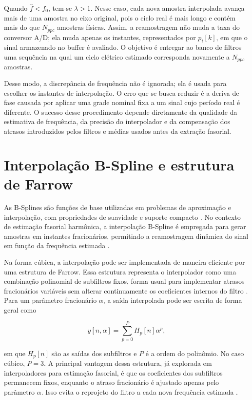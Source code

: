 Quando $\hat{f}<f_0$, tem-se $\lambda>1$. Nesse caso, cada nova amostra interpolada avança mais de uma amostra no eixo original, pois o ciclo real é mais longo e contém mais do que $N_{ppc}$ amostras físicas. Assim, a reamostragem não muda a taxa do conversor A/D; ela muda apenas os instantes, representados por $p_i[k]$, em que o sinal armazenado no buffer é avaliado. O objetivo é entregar ao banco de filtros uma sequência na qual um ciclo elétrico estimado corresponda novamente a $N_{ppc}$ amostras.

Desse modo, a discrepância de frequência não é ignorada; ela é usada para escolher os instantes de interpolação. O erro que se busca reduzir é a deriva de fase causada por aplicar uma grade nominal fixa a um sinal cujo período real é diferente. O sucesso desse procedimento depende diretamente da qualidade da estimativa de frequência, da precisão do interpolador e da compensação dos atrasos introduzidos pelos filtros e médias usados antes da extração fasorial.

\section{Interpolação B-Spline e estrutura de Farrow}

As B-Splines são funções de base utilizadas em problemas de aproximação e interpolação, com propriedades de suavidade e suporte compacto \cite{uns99}. No contexto de estimação fasorial harmônica, a interpolação B-Spline é empregada para gerar amostras em instantes fracionários, permitindo a reamostragem dinâmica do sinal em função da frequência estimada \cite{aleixo2022,aleixoTese}.

Na forma cúbica, a interpolação pode ser implementada de maneira eficiente por uma estrutura de Farrow. Essa estrutura representa o interpolador como uma combinação polinomial de subfiltros fixos, forma usual para implementar atrasos fracionários variáveis sem alterar continuamente os coeficientes internos do filtro \cite{aleixo2022,aleixoTese}. Para um parâmetro fracionário $\alpha$, a saída interpolada pode ser escrita de forma geral como

\begin{equation}
y[n,\alpha] = \sum_{p=0}^{P} H_p[n]\alpha^p,
\label{eq:cap2_farrow_geral}
\end{equation}

\noindent em que $H_p[n]$ são as saídas dos subfiltros e $P$ é a ordem do polinômio. No caso cúbico, $P=3$. A principal vantagem dessa estrutura, já explorada em interpoladores para estimação fasorial, é que os coeficientes dos subfiltros permanecem fixos, enquanto o atraso fracionário é ajustado apenas pelo parâmetro $\alpha$. Isso evita o reprojeto do filtro a cada nova frequência estimada \cite{aleixo2022,aleixoTese}.

